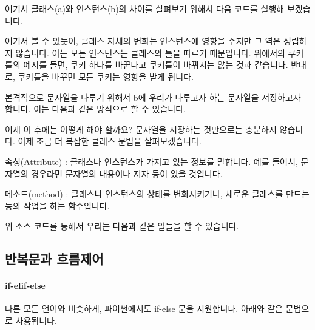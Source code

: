 \documentclass[twoside]{article}
\begin{document}
여기서 클래스(a)와 인스턴스(b)의 차이를 살펴보기 위해서 다음 코드를 실행해 보겠습니다. 



여기서 볼 수 있듯이, 클래스 자체의 변화는 인스턴스에 영향을 주지만 그 역은 성립하지 않습니다. 이는 모든 인스턴스는 클래스의 틀을 따르기 때문입니다. 위에서의 쿠키틀의 예시를 들면, 쿠키 하나를 바꾼다고 쿠키틀이 바뀌지는 않는 것과 같습니다. 반대로, 쿠키틀을 바꾸면 모든 쿠키는 영향을 받게 됩니다. 


본격적으로 문자열을 다루기 위해서 b에 우리가 다루고자 하는 문자열을 저장하고자 합니다. 이는 다음과 같은 방식으로 할 수 있습니다. 



이제 이 후에는 어떻게 해야 할까요? 문자열을 저장하는 것만으로는 충분하지 않습니다. 이제 조금 더 복잡한 클래스 문법을 살펴보겠습니다. 



\begin{compactitem}
\item 속성(Attribute) : 클래스나 인스턴스가 가지고 있는 정보를 말합니다. 예를 들어서, 문자열의 경우라면 문자열의 내용이나 저자 등이 있을 것입니다. 
\item 메소드(method) : 클래스나 인스턴스의 상태를 변화시키거나, 새로운 클래스를 만드는 등의 작업을 하는 함수입니다. 
\end{compactitem}



위 소스 코드를 통해서 우리는 다음과 같은 일들을 할 수 있습니다. 




                
\subsection{반복문과 흐름제어} 

\paragraph{if-elif-else} 다른 모든 언어와 비슷하게, 파이썬에서도 if-else 문을 지원합니다. 아래와 같은 문법으로 사용됩니다. 
\end{document}
